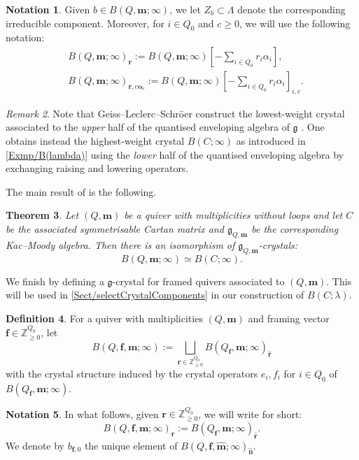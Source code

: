 \documentclass[a4paper,12pt]{article}
\theoremstyle{definition}
\newtheorem{definition}{Definition}[section]
\newtheorem{notation}[definition]{Notation}
\theoremstyle{plain}
\newtheorem{theorem}[definition]{Theorem}
\theoremstyle{remark}
\newtheorem{remark}[definition]{Remark}
\newcommand\bbZ{\mathbb{Z}}
\newcommand\bfalpha{\bm{\alpha}}
\newcommand\bff{\mathbf{f}}
\newcommand\bfm{\mathbf{m}}
\newcommand\bfr{\mathbf{r}}
\begin{document}
\begin{notation}
Given $b\in B(Q,\bfm;\infty)$, we let $Z_b\subset\Lambda$ denote the corresponding irreducible component. Moreover, for $i\in Q_0$ and $c\geq0$, we will use the following notation:
\begin{align*}
& B(Q,\bfm;\infty)_{\bfr} := B(Q,\bfm;\infty)\left[-\sum_{i\in Q_0}r_i\alpha_i\right] , \\
& B(Q,\bfm;\infty)_{\bfr,c\bfalpha_i} :=B(Q,\bfm;\infty)\left[-\sum_{i\in Q_0}r_i\alpha_i\right]_{i,c}.
\end{align*}
\end{notation}

\begin{remark}
Note that Geiss--Leclerc--Schr\"{o}er construct the lowest-weight crystal associated to the \emph{upper} half of the quantised enveloping algebra of $\mathfrak{g}$ \cite[\S 5]{GLS18a}. One obtains instead the highest-weight crystal $B(C;\infty)$ as introduced in \cref{Exmp/B(lambda)} using the \emph{lower} half of the quantised enveloping algebra by exchanging raising and lowering operators.
\end{remark}

The main result of \cite{GLS18a} is the following.

\begin{theorem}\label{Thm/Geiss-Leclerc-SchröerCrystal}\emph{\cite[Thm.\ 5.4]{GLS18a}}
Let $(Q,\bfm)$ be a quiver with multiplicities without loops and let $C$ be the associated symmetrisable Cartan matrix and $\mathfrak{g}_{Q,\bfm}$ be the corresponding Kac--Moody algebra. Then there is an isomorphism of $\mathfrak{g}_{Q,\bfm}$-crystals:
\[
B(Q,\bfm;\infty)\simeq B(C;\infty)
.
\]
\end{theorem}

We finish by defining a $\mathfrak{g}$-crystal for framed quivers associated to $(Q,\bfm)$. This will be used in \cref{Sect/selectCrystalComponents} in our construction of $B(C;\lambda)$.

\begin{definition}
For a quiver with multiplicities $(Q,\bfm)$ and framing vector $\bff\in\bbZ_{\geq0}^{Q_0}$, let
\[
B(Q,\bff,\bfm;\infty):=\bigsqcup_{\bfr\in\bbZ_{\geq0}^{Q_0}}B(Q_\bff,\bfm;\infty)_{\widehat{\bfr}}
\]
with the crystal structure induced by the crystal operators $e_i,f_i$ for $ i\in Q_0$ of $B(Q_\bff,\bfm;\infty)$. 
\end{definition}

\begin{notation}
In what follows, given $\bfr\in\bbZ_{\geq0}^{Q_0}$, we will write for short:
\[
B(Q,\bff,\bfm;\infty)_\bfr:=B(Q_\bff,\bfm;\infty)_{\widehat{\bfr}}.
\]
We denote by $b_{\bff,0}$ the unique element of $B(Q,\bff,\widehat{\bfm};\infty)_{\hat{\mathbf{0}}}$.
\end{notation}
\end{document}
